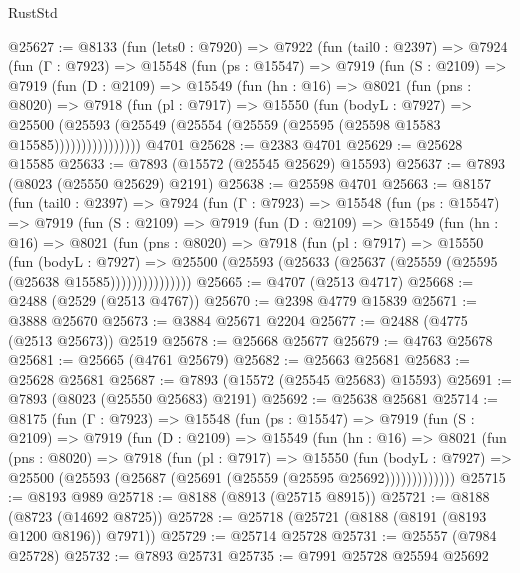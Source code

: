 \begin{lexlean}{RustStd}
\begin{coremodule}
@25627 := @8133
    (fun (lets0 : @7920) =>
    @7922
      (fun (tail0 : @2397) =>
      @7924
        (fun (Γ : @7923) =>
        @15548
          (fun (ps : @15547) =>
          @7919
            (fun (S : @2109) =>
            @7919
              (fun (D : @2109) =>
              @15549
                (fun (hn : @16) =>
                @8021
                  (fun (pns : @8020) =>
                  @7918
                    (fun (pl : @7917) =>
                    @15550
                      (fun (bodyL : @7927) =>
                      @25500
                        (@25593
                          (@25549 (@25554 (@25559 (@25595 (@25598 @15583 @15585))))))))))))))))
    @4701
@25628 := @2383 @4701
@25629 := @25628 @15585
@25633 := @7893 (@15572 (@25545 @25629) @15593)
@25637 := @7893 (@8023 (@25550 @25629) @2191)
@25638 := @25598 @4701
@25663 := @8157
    (fun (tail0 : @2397) =>
    @7924
      (fun (Γ : @7923) =>
      @15548
        (fun (ps : @15547) =>
        @7919
          (fun (S : @2109) =>
          @7919
            (fun (D : @2109) =>
            @15549
              (fun (hn : @16) =>
              @8021
                (fun (pns : @8020) =>
                @7918
                  (fun (pl : @7917) =>
                  @15550
                    (fun (bodyL : @7927) =>
                    @25500 (@25593 (@25633 (@25637 (@25559 (@25595 (@25638 @15585)))))))))))))))
@25665 := @4707 (@2513 @4717)
@25668 := @2488 (@2529 (@2513 @4767))
@25670 := @2398 @4779 @15839
@25671 := @3888 @25670
@25673 := @3884 @25671 @2204
@25677 := @2488 (@4775 (@2513 @25673)) @2519
@25678 := @25668 @25677
@25679 := @4763 @25678
@25681 := @25665 (@4761 @25679)
@25682 := @25663 @25681
@25683 := @25628 @25681
@25687 := @7893 (@15572 (@25545 @25683) @15593)
@25691 := @7893 (@8023 (@25550 @25683) @2191)
@25692 := @25638 @25681
@25714 := @8175
    (fun (Γ : @7923) =>
    @15548
      (fun (ps : @15547) =>
      @7919
        (fun (S : @2109) =>
        @7919
          (fun (D : @2109) =>
          @15549
            (fun (hn : @16) =>
            @8021
              (fun (pns : @8020) =>
              @7918
                (fun (pl : @7917) =>
                @15550
                  (fun (bodyL : @7927) =>
                  @25500 (@25593 (@25687 (@25691 (@25559 (@25595 @25692)))))))))))))
@25715 := @8193 @989
@25718 := @8188 (@8913 (@25715 @8915))
@25721 := @8188 (@8723 (@14692 @8725))
@25728 := @25718 (@25721 (@8188 (@8191 (@8193 @1200 @8196)) @7971))
@25729 := @25714 @25728
@25731 := @25557 (@7984 @25728)
@25732 := @7893 @25731
@25735 := @7991 @25728 @25594 @25692

\end{coremodule}
\end{lexlean}
